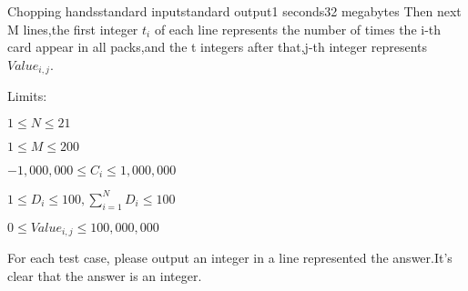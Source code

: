 \begin{problem}{Chopping hands}{standard input}{standard output}{1 seconds}{32 megabytes}
Then next M lines,the first integer $ t_{i} $ of each line represents the number of times the i-th card appear in all packs,and the t integers after that,j-th integer represents $ Value_{i,j} $.

Limits:

$ 1 \leq N \leq 21 $

$ 1 \leq M \leq 200 $

$ -1,000,000 \leq C_{i} \leq 1,000,000 $

$ 1 \leq D_{i} \leq 100 , \sum_{i=1}^{N}D_{i} \leq 100 $

$ 0 \leq Value_{i,j} \leq 100,000,000 $

\OutputFile
For each test case, please output an integer in a line represented the answer.It's clear that the answer is an integer.

\Example

\begin{example}
%
\end{example}

\end{problem}

